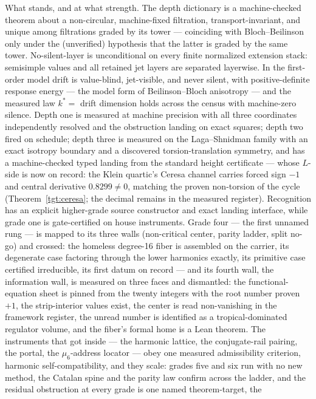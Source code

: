 \documentclass[11pt]{article}
\theoremstyle{definition}
\theoremstyle{remark}
\begin{document}
What stands, and at what strength. The depth dictionary is a machine-checked
theorem about a non-circular, machine-fixed filtration, transport-invariant,
and unique among filtrations graded by its tower --- coinciding with
Bloch--Beilinson only under the (unverified) hypothesis that the latter is
graded by the same tower. No-silent-layer is
unconditional on every finite normalized extension stack: semisimple values and
all retained jet layers are separated layerwise. In the first-order model drift
is value-blind, jet-visible, and never silent, with positive-definite response
energy --- the model form of Beilinson--Bloch anisotropy --- and the measured
law $k^*=$ drift dimension holds across the census with machine-zero silence.
Depth one is measured at machine precision with all three coordinates
independently resolved and the obstruction landing on exact squares; depth two
fired on schedule; depth three is measured on the Laga--Shnidman family with an
exact isotropy boundary and a discovered torsion-translation symmetry, and has
a machine-checked typed landing from the standard height certificate --- whose
$L$-side is now on record: the Klein
quartic's Ceresa channel carries forced sign $-1$ and central derivative
$0.8299\ne0$, matching the proven non-torsion of the cycle
(Theorem~\ref{tgt:ceresa}; the decimal remains in the measured register).
Recognition has an explicit higher-grade source constructor and exact landing
interface, while grade one is gate-certified on house instruments. Grade four --- the
first unnamed rung --- is mapped to its three walls (non-critical center,
parity ladder, split no-go) and crossed: the homeless degree-16 fiber is
assembled on the carrier, its degenerate case factoring through the lower
harmonics exactly, its primitive case certified irreducible, its first datum
on record --- and its fourth wall, the information wall, is measured on three
faces and dismantled: the functional-equation sheet is pinned from the twenty
integers with the root number proven $+1$, the strip-interior values exist,
the center is read non-vanishing in the framework register, the unread number
is identified as a tropical-dominated regulator volume, and the fiber's
formal home is a Lean theorem. The instruments that got inside --- the
harmonic lattice, the conjugate-rail pairing, the portal, the $\mu_6$-address
locator --- obey one measured admissibility criterion, harmonic
self-compatibility, and they scale: grades five and six run with no new
method, the Catalan spine and the parity law confirm across the ladder, and
the residual obstruction at every grade is one named theorem-target, the
\end{document}
